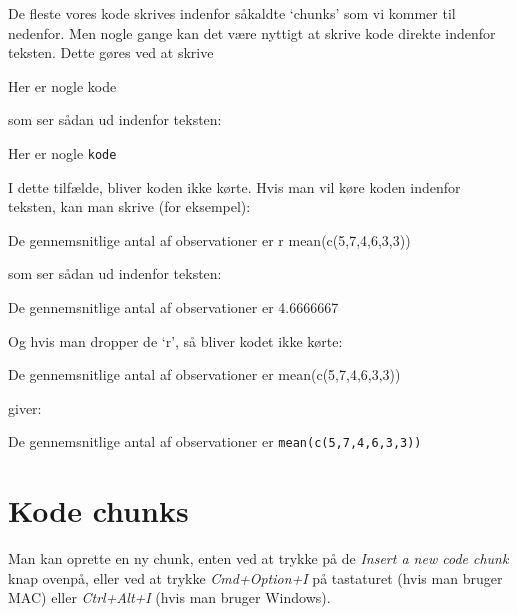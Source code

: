 \documentclass[
]{book}
\newenvironment{Shaded}{\begin{snugshade}}{\end{snugshade}}
\newcommand{\AttributeTok}[1]{\textcolor[rgb]{0.77,0.63,0.00}{#1}}
\newcommand{\NormalTok}[1]{#1}
\newcommand{\StringTok}[1]{\textcolor[rgb]{0.31,0.60,0.02}{#1}}
\begin{document}
De fleste vores kode skrives indenfor såkaldte `chunks' som vi kommer til nedenfor. Men nogle gange kan det være nyttigt at skrive kode direkte indenfor teksten. Dette gøres ved at skrive

\begin{Shaded}
\begin{Highlighting}[]
\NormalTok{Her er nogle }\StringTok{\textasciigrave{}}\AttributeTok{kode}\StringTok{\textasciigrave{}}
\end{Highlighting}
\end{Shaded}

som ser sådan ud indenfor teksten:

Her er nogle \texttt{kode}

I dette tilfælde, bliver koden ikke kørte. Hvis man vil køre koden indenfor teksten, kan man skrive (for eksempel):

\begin{Shaded}
\begin{Highlighting}[]
\NormalTok{De gennemsnitlige antal af observationer er }\StringTok{\textasciigrave{}}\AttributeTok{r mean(c(5,7,4,6,3,3))}\StringTok{\textasciigrave{}}
\end{Highlighting}
\end{Shaded}

som ser sådan ud indenfor teksten:

De gennemsnitlige antal af observationer er 4.6666667

Og hvis man dropper de `r', så bliver kodet ikke kørte:

\begin{Shaded}
\begin{Highlighting}[]
\NormalTok{De gennemsnitlige antal af observationer er }\StringTok{\textasciigrave{}}\AttributeTok{mean(c(5,7,4,6,3,3))}\StringTok{\textasciigrave{}}
\end{Highlighting}
\end{Shaded}

giver:

De gennemsnitlige antal af observationer er \texttt{mean(c(5,7,4,6,3,3))}

\hypertarget{kode-chunks}{%
\section{Kode chunks}\label{kode-chunks}}

Man kan oprette en ny chunk, enten ved at trykke på de \emph{Insert a new code chunk} knap ovenpå, eller ved at trykke \emph{Cmd+Option+I} på tastaturet (hvis man bruger MAC) eller \emph{Ctrl+Alt+I} (hvis man bruger Windows).
\end{document}
